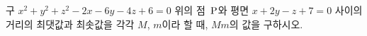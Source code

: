 구 $x^2+y^2+z^2-2x-6y-4z+6=0$ 위의 점~$\mathrm{P}$와 평면 $x+2y-z+7=0$ 사이의 거리의 최댓값과 최솟값을 각각 $M$, $m$이라 할 때, $Mm$의 값을 구하시오.
